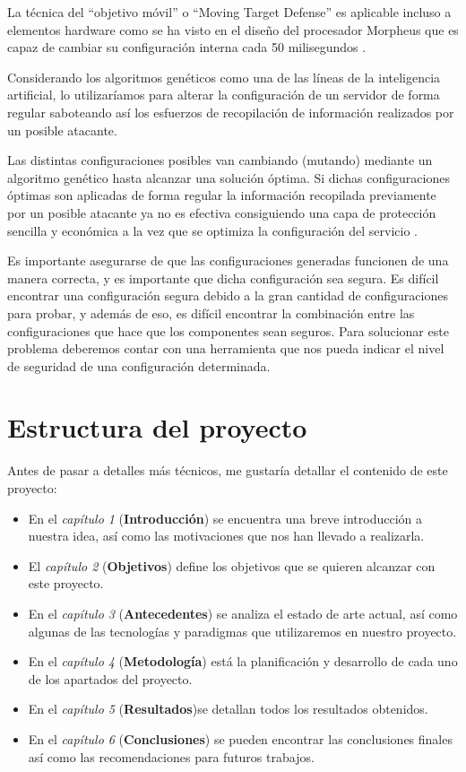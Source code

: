 \bigskip
La técnica del ``objetivo móvil'' o ``Moving Target Defense'' es aplicable incluso a elementos hardware como se ha visto en el diseño del procesador Morpheus que es capaz de cambiar su configuración interna cada 50 milisegundos \cite{gallagher_morpheus:_2019}.

\bigskip
Considerando los algoritmos genéticos como una de las líneas de la inteligencia artificial, lo utilizaríamos \cite{tribak_alisis_2012} para alterar la configuración de un servidor de forma regular saboteando así los esfuerzos de recopilación de información realizados por un posible atacante.

\bigskip
Las distintas configuraciones posibles van cambiando (mutando) mediante un algoritmo genético hasta alcanzar una solución óptima. Si dichas configuraciones óptimas son aplicadas de forma regular la información recopilada previamente por un posible atacante ya no es efectiva consiguiendo una capa de protección sencilla y económica a la vez que se optimiza la configuración del servicio \cite{gensch_evolving_2016}.

\bigskip
Es importante asegurarse de que las configuraciones generadas funcionen de una manera correcta, y es importante que dicha configuración sea segura. Es difícil encontrar una configuración segura debido a la gran cantidad de configuraciones para probar, y además de eso, es difícil encontrar la combinación entre las configuraciones que hace que los componentes sean seguros. Para solucionar este problema deberemos contar con una herramienta que nos pueda indicar el nivel de seguridad de una configuración determinada.


\section{Estructura del proyecto}

\bigskip
Antes de pasar a detalles más técnicos, me gustaría detallar el contenido de este proyecto:

\begin{itemize}
  \item En el \textit{capítulo 1} (\textbf{Introducción}) se encuentra una breve introducción a nuestra idea, así como las motivaciones que nos han llevado a realizarla.
  \item El \textit{capítulo 2} (\textbf{Objetivos}) define los objetivos que se quieren alcanzar con este proyecto.
  \item En el \textit{capítulo 3} (\textbf{Antecedentes}) se analiza el estado de arte actual, así como algunas de las tecnologías y paradigmas que utilizaremos en nuestro proyecto.
  \item En el \textit{capítulo 4} (\textbf{Metodología}) está la planificación y desarrollo de cada uno de los apartados del proyecto.
  \item En el \textit{capítulo 5} (\textbf{Resultados})se detallan todos los resultados obtenidos.
  \item En el \textit{capítulo 6} (\textbf{Conclusiones}) se pueden encontrar las conclusiones finales  así como las recomendaciones para futuros trabajos.

\end{itemize}

